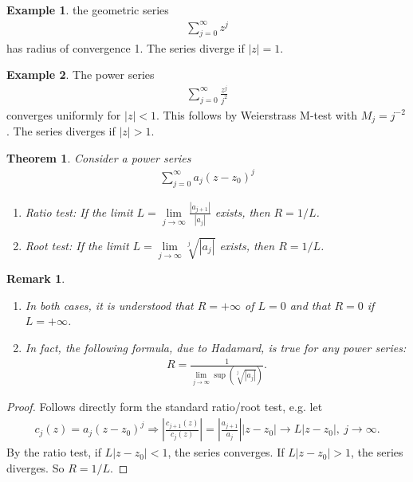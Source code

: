 \documentclass[12pt, a4paper]{article}
\theoremstyle{plain}
\newtheorem{thm}{Theorem} %
\newtheorem{rem}{Remark}
\theoremstyle{definition}
\newtheorem{example}{Example} %
\begin{document}
		\begin{example}
			the geometric series 
			\begin{align*}
				\sum\limits_{j=0}^{\infty}z^j
			\end{align*}
			has radius of convergence 1. The series diverge if $|z|=1$.\\
		\end{example}

		\begin{example}
			The power series 
			\begin{align*}
				\sum\limits_{j=0}^{\infty}\frac{z^j}{j^2}
			\end{align*}
			converges uniformly for $|z|<1$. This follows by Weierstrass M-test with $M_j=j^{-2}$. The series diverges if $|z|>1$.\\
		\end{example}

		\begin{thm}
			Consider a power series
			\begin{align*}
				\sum\limits_{j=0}^{\infty}a_j(z-z_0)^j
			\end{align*}
			\begin{enumerate}[label=(\roman*)]
				\item Ratio test: If the limit $\displaystyle L = \lim\limits_{j\to\infty} \frac{|a_{j+1}|}{|a_j|}$ exists, then $R=1/L$.
				\item Root test: If the limit $\displaystyle L = \lim\limits_{j\to\infty} \sqrt[j]{|a_j|}$ exists, then $R=1/L$.\\
			\end{enumerate}
		\end{thm}

		\begin{rem}~\\
			\begin{enumerate}[label=(\roman*)]
				\item In both cases, it is understood that $R=+\infty$ of $L=0$ and that $R=0$ if $L=+\infty$.
				\item In fact, the following formula, due to Hadamard, is true for any power series:
				\begin{align*}
					R = \frac{1}{\lim\limits_{j\to\infty}\sup(\sqrt[j]{|a_j|})}.
				\end{align*}
			\end{enumerate}
		\end{rem}

		\begin{proof}
			Follows directly form the standard ratio/root test, e.g. let 
			\begin{align*}
				c_j(z) =
				a_j(z-z_0)^j\Rightarrow \left|\frac{c_{j+1}(z)}{c_j(z)}\right| =
				\left|\frac{a_{j+1}}{a_j}\right||z-z_0| \to L|z-z_0|,\:j\to\infty.
			\end{align*}
			By the ratio test, if $L|z-z_0|<1$, the series converges. If $L|z-z_0|>1$, the series diverges. So $R=1/L$. 
		\end{proof}
\end{document}
